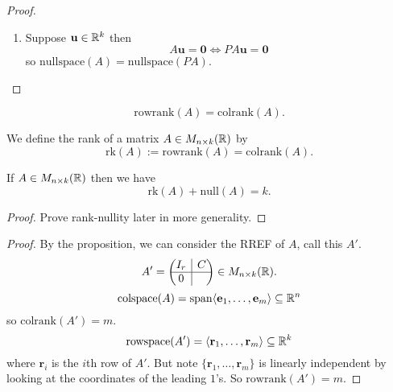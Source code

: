 \documentclass[10pt, a4paper]{article}
\newcommand{\mbf}[1]{\mathbf{#1}}
\begin{document}
\begin{proposition}
\begin{proof}
\begin{enumerate}[label = (\roman*)]
            Proof (claim)

            $\{P\mbf{v}_1, \dotsc, P\mbf{v}_r\}$ is certainly linearly independent
            (by last lemma).
            If $\mbf{v} \in PU$ then $\mbf{v} = P\mbf{u}$ for some $\mbf{u} + \lambda_1\mbf{v}_1 + \dotsi + \lambda_r\mbf{v}_r \in U$ so $\mbf{v} = P(\lambda_1\mbf{v}_1 + \dotsi + \lambda_r\mbf{v}_r) = \lambda_1P\mbf{v}_1 + \dotsi + \lambda_rP\mbf{v}_r$.
            So spanning.

            \item Suppose $\mbf{u} \in \R ^ k$ then
            \[
            A\mbf{u} = \mbf{0} \iff PA\mbf{u} = \mbf{0}
            \]
            so $\mathrm{nullspace}(A) = \mathrm{nullspace}(PA)$.
        \end{enumerate}
    \end{proof}
\end{proposition}

\begin{theorem}[Rank Theorem, label = thm:rankthm]
    \[
    \mathrm{rowrank}(A) = \mathrm{colrank}(A).
    \]
\end{theorem}

\begin{definition}[Rank]
    We define the rank of a matrix $A \in M_{n \times k}(\mathbb{R})$ by
    \[
    \mathrm{rk}(A) := \mathrm{rowrank}(A) = \mathrm{colrank}(A).
    \]
\end{definition}

\begin{theorem}
    If $A \in M_{n \times k}(\mathbb{R})$ then we have
    \[
    \mathrm{rk}(A) + \mathrm{null}(A) = k.
    \]
    \begin{proof}
        Prove rank-nullity later in more generality.
    \end{proof}
\end{theorem}

\begin{theorem}[continues = thm:rankthm]
    \begin{proof}
        By the proposition,
        we can consider the RREF of $A$,
        call this $A'$.
        \[
        A' = \left(\hspace{-5pt}
        \begin{array}{c|c}
            I_r & C \\
            \hline
            0
        \end{array}
        \hspace{-5pt}\right) \in M_{n \times k}(\mathbb{R}).
        \]
        \[
        \mathrm{colspace}(A) = \mathrm{span}\langle\mbf{e}_1, \dotsc, \mbf{e}_m\rangle \subseteq \R ^ n
        \]
        so $\mathrm{colrank}(A') = m$.
        \[
        \mathrm{rowspace}(A') = \langle\mbf{r}_1, \dotsc, \mbf{r}_m\rangle \subseteq \R ^ k
        \]
        where $\mbf{r}_i$ is the $i$th row of $A'$.
        But note $\{\mbf{r}_1, \dotsc, \mbf{r}_m\}$ is linearly independent by looking at the coordinates of the leading $1$'s.
        So $\mathrm{rowrank}(A') = m$.
    \end{proof}
\end{theorem}
\end{document}
